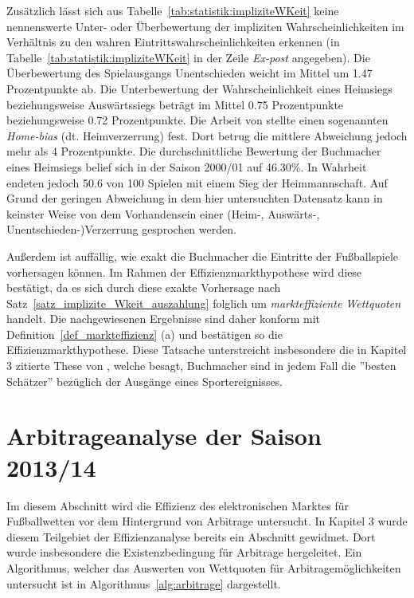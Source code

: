 Zusätzlich lässt sich aus Tabelle~\ref{tab:statistik:impliziteWKeit} keine nennenswerte Unter- oder Überbewertung der impliziten Wahrscheinlichkeiten im Verhältnis zu den wahren Eintrittswahrscheinlichkeiten  erkennen (in Tabelle~\ref{tab:statistik:impliziteWKeit} in der Zeile \textit{Ex-post} angegeben). Die Überbewertung des Spielausgangs Unentschieden weicht im Mittel um 1.47 Prozentpunkte ab. Die Unterbewertung der Wahrscheinlichkeit eines Heimsiegs beziehungsweise Auswärtssiegs beträgt im Mittel 0.75 Prozentpunkte beziehungsweise 0.72 Prozentpunkte. Die Arbeit von \citet[S. 450]{kossmeier2008efficiency} stellte einen sogenannten \textit{Home-bias} (dt. Heimverzerrung) fest. Dort betrug die mittlere Abweichung jedoch mehr als 4 Prozentpunkte. Die durchschnittliche Bewertung der Buchmacher eines Heimsiegs belief sich in der Saison 2000/01 auf 46.30\%. In Wahrheit endeten jedoch 50.6 von 100 Spielen mit einem Sieg der Heimmannschaft. Auf Grund der geringen Abweichung in dem hier untersuchten Datensatz kann in keinster Weise von dem Vorhandensein einer (Heim-, Auswärts-, Unentschieden-)Verzerrung gesprochen werden.

Außerdem ist auffällig, wie exakt die Buchmacher die Eintritte der Fußballspiele vorhersagen können. Im Rahmen der Effizienzmarkthypothese wird diese bestätigt, da es sich durch diese exakte Vorhersage nach Satz~\ref{satz_implizite_Wkeit_auszahlung} folglich um \textit{markteffiziente Wettquoten} handelt. Die nachgewiesenen Ergebnisse sind daher konform mit Definition~\ref{def_markteffizienz} (a) und bestätigen so die Effizienzmarkthypothese. Diese Tatsache unterstreicht insbesondere die in Kapitel 3 zitierte These von \citet[S. 243]{levitt2004gambling}, welche besagt, Buchmacher sind in jedem Fall die ''besten Schätzer'' bezüglich der Ausgänge eines Sportereignisses.


\section{Arbitrageanalyse der Saison 2013/14}
Im diesem Abschnitt wird die Effizienz des elektronischen Marktes für Fußballwetten vor dem Hintergrund von Arbitrage untersucht. In Kapitel 3 wurde diesem Teilgebiet der Effizienzanalyse bereits ein Abschnitt gewidmet. Dort wurde insbesondere die Existenzbedingung für Arbitrage hergeleitet. Ein Algorithmus, welcher das Auswerten von Wettquoten für Arbitragemöglichkeiten untersucht ist in Algorithmus~\ref{alg:arbitrage} dargestellt. 


